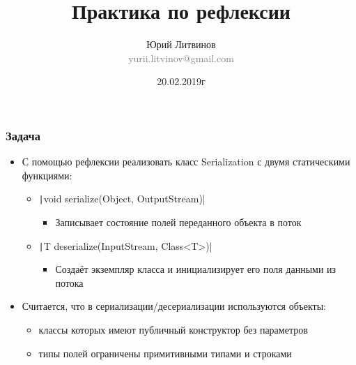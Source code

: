 \documentclass[xetex,mathserif,serif]{beamer}
\title{Практика по рефлексии}
\author[Юрий Литвинов]{Юрий Литвинов\\\small{\textcolor{gray}{yurii.litvinov@gmail.com}}}
\date{20.02.2019г}
\begin{document}
	\frame{\titlepage}

	\begin{frame}
		\frametitle{Задача}
		\begin{itemize}
			\item С помощью рефлексии реализовать класс Serialization с двумя статическими функциями:
			\begin{itemize}
				\item \texttt|void serialize(Object, OutputStream)|
				\begin{itemize}
					\item Записывает состояние полей переданного объекта в поток
				\end{itemize}
				\item \texttt|T deserialize(InputStream, Class<T>)|
				\begin{itemize}
					\item Создаёт экземпляр класса и инициализирует его поля данными из потока
				\end{itemize}
			\end{itemize}
			\item Считается, что в сериализации/десериализации используются объекты:
			\begin{itemize}
				\item классы которых имеют публичный конструктор без параметров
				\item типы полей ограничены примитивными типами и строками
			\end{itemize}
		\end{itemize}
	\end{frame}
\end{document}
